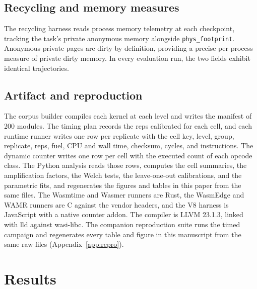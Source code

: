 \documentclass{ws-jcsc}
\begin{document}


\subsection{Recycling and memory measures}
The recycling harness reads process memory telemetry at each checkpoint, tracking the task's private anonymous memory alongside \texttt{phys\_footprint}. Anonymous private pages are dirty by definition, providing a precise per-process measure of private dirty memory. In every evaluation run, the two fields exhibit identical trajectories.

\subsection{Artifact and reproduction}
The corpus builder compiles each kernel at each level and writes the manifest of 200 modules. The timing plan records the reps calibrated for each cell, and each runtime runner writes one row per replicate with the cell key, level, group, replicate, reps, fuel, CPU and wall time, checksum, cycles, and instructions. The dynamic counter writes one row per cell with the executed count of each opcode class. The Python analysis reads those rows, computes the cell summaries, the amplification factors, the Welch tests, the leave-one-out calibrations, and the parametric fits, and regenerates the figures and tables in this paper from the same files. The Wasmtime and Wasmer runners are Rust, the WasmEdge and WAMR runners are C against the vendor headers, and the V8 harness is JavaScript with a native counter addon. The compiler is LLVM 23.1.3, linked with lld against wasi-libc. The companion reproduction suite runs the timed campaign and regenerates every table and figure in this manuscript from the same raw files (Appendix~\ref{app:repro}).

\begin{center}
\end{center}

\section{Results}
\label{sec:results}
\end{document}
